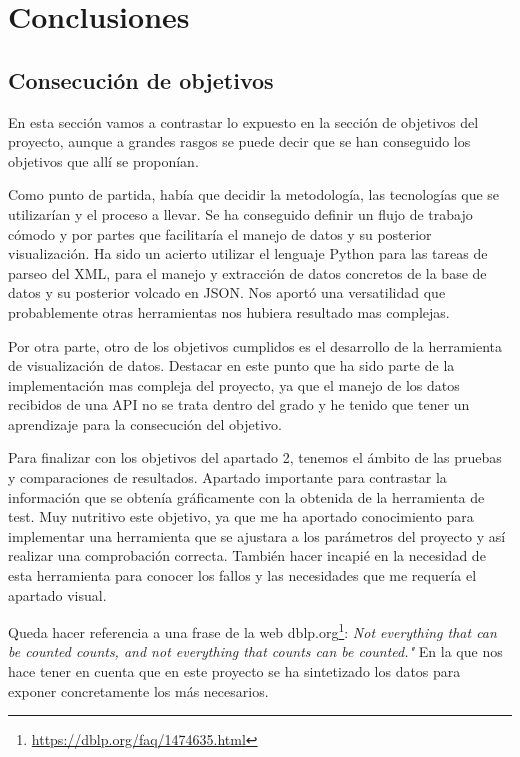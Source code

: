 \documentclass[a4paper, 12pt]{book}
\begin{document}

\cleardoublepage
\chapter{Conclusiones}
\label{chap:conclusiones}
\section{Consecución de objetivos}
\label{sec:consecucion-objetivos}

En esta sección vamos a contrastar lo expuesto en la sección de objetivos del proyecto, aunque a grandes rasgos se puede decir que se han conseguido los objetivos que allí se proponían.

Como punto de partida, había que decidir la metodología, las tecnologías que se utilizarían y el proceso a llevar. Se ha conseguido definir un flujo de trabajo cómodo y por partes que facilitaría el manejo de datos y su posterior visualización. Ha sido un acierto utilizar el lenguaje Python para las tareas de parseo del XML, para el manejo y extracción de datos concretos de la base de datos y su posterior volcado en JSON. Nos aportó una versatilidad que probablemente otras herramientas nos hubiera resultado mas complejas.

Por otra parte, otro de los objetivos cumplidos es el desarrollo de la herramienta de visualización de datos. Destacar en este punto que ha sido parte de la implementación mas compleja del proyecto, ya que el manejo de los datos recibidos de una API no se trata dentro del grado y he tenido que tener un aprendizaje para la consecución del objetivo. 

Para finalizar con los objetivos del apartado 2, tenemos el ámbito de las pruebas y comparaciones de resultados. Apartado importante para contrastar la información que se obtenía gráficamente con la obtenida de la herramienta de test. Muy nutritivo este objetivo, ya que me ha aportado conocimiento para implementar una herramienta que se ajustara a los parámetros del proyecto y así realizar una comprobación correcta.
También hacer incapié en la necesidad de esta herramienta para conocer los fallos y las necesidades que me requería el apartado visual.

Queda hacer referencia a una frase de la web dblp.org\footnote{\url{https://dblp.org/faq/1474635.html}}: \textit{Not everything that can be counted counts, and not everything that counts can be counted."} En la que nos hace tener en cuenta que en este proyecto se ha sintetizado los datos para exponer concretamente los más necesarios.
\end{document}
